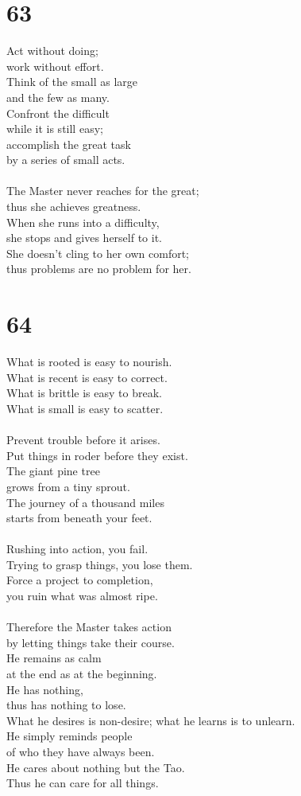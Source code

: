 \documentclass[b5paper, 12pt, oneside]{book}
\begin{document}
\chapter*{63}
Act without doing;\\
work without effort.\\
Think of the small as large\\
and the few as many.\\
Confront the difficult\\
while it is still easy;\\
accomplish the great task\\
by a series of small acts.\\
\\
The Master never reaches for the great;\\
thus she achieves greatness.\\
When she runs into a difficulty,\\
she stops and gives herself to it.\\
She doesn't cling to her own comfort;\\
thus problems are no problem for her.

\chapter*{64}
What is rooted is easy to nourish.\\
What is recent is easy to correct.\\
What is brittle is easy to break.\\
What is small is easy to scatter.\\
\\
Prevent trouble before it arises.\\
Put things in roder before they exist.\\
The giant pine tree\\
grows from a tiny sprout.\\
The journey of a thousand miles\\
starts from beneath your feet.\\
\\
Rushing into action, you fail.\\
Trying to grasp things, you lose them.\\
Force a project to completion,\\
you ruin what was almost ripe.\\
\\
Therefore the Master takes action\\
by letting things take their course.\\
He remains as calm\\
at the end as at the beginning.\\
He has nothing,\\
thus has nothing to lose.\\
What he desires is non-desire;
what he learns is to unlearn.\\
He simply reminds people\\
of who they have always been.\\
He cares about nothing but the Tao.\\
Thus he can care for all things.
\end{document}
